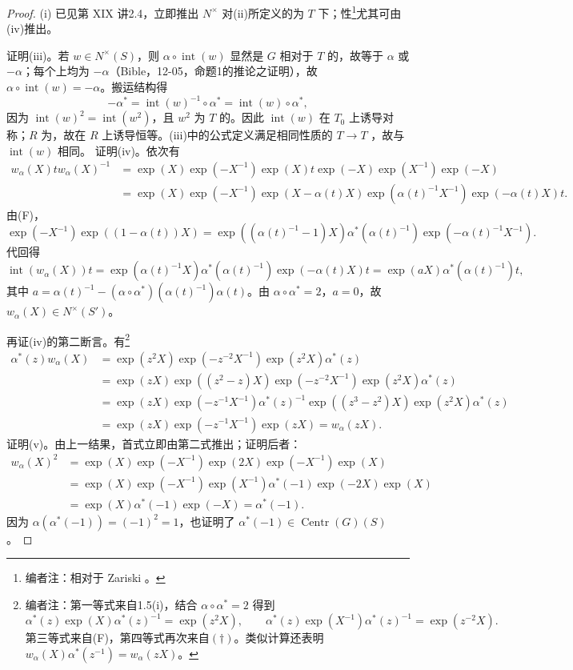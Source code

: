 \begin{proof}
(i) 已见第 XIX 讲2.4，立即推出 $N^\times$ 对(ii)所定义的为 $T$ 下；性\footnote{编者注：相对于 Zariski 。}尤其可由(iv)推出。

证明(iii)。若 $w\in N^\times(S)$，则 $\alpha\circ\operatorname{int}(w)$ 显然是 $G$ 相对于 $T$ 的，故等于 $\alpha$ 或 $-\alpha$；每个上均为 $-\alpha$（Bible，12-05，命题1的推论之证明），故 $\alpha\circ\operatorname{int}(w)=-\alpha$。搬运结构得
\[-\alpha^*=\operatorname{int}(w)^{-1}\circ\alpha^*=\operatorname{int}(w)\circ\alpha^*,\]
因为 $\operatorname{int}(w)^2=\operatorname{int}(w^2)$，且 $w^2$ 为 $T$ 的。因此 $\operatorname{int}(w)$ 在 $T_0$ 上诱导对称；$R$ 为，故在 $R$ 上诱导恒等。(iii)中的公式定义满足相同性质的 $T\to T$ ，故与 $\operatorname{int}(w)$ 相同。
证明(iv)。依次有
\[\begin{split}w_\alpha(X)tw_\alpha(X)^{-1}&=\exp(X)\exp(-X^{-1})\exp(X)t\exp(-X)\exp(X^{-1})\exp(-X)\\&=\exp(X)\exp(-X^{-1})\exp(X-\alpha(t)X)\exp(\alpha(t)^{-1}X^{-1})\exp(-\alpha(t)X)t.\end{split}\]
由(F)，
\[\exp(-X^{-1})\exp((1-\alpha(t))X)=\exp((\alpha(t)^{-1}-1)X)\alpha^*(\alpha(t)^{-1})\exp(-\alpha(t)^{-1}X^{-1}).\]
代回得
\[\operatorname{int}(w_\alpha(X))t=\exp(\alpha(t)^{-1}X)\alpha^*(\alpha(t)^{-1})\exp(-\alpha(t)X)t=\exp(aX)\alpha^*(\alpha(t)^{-1})t,\]
其中 $a=\alpha(t)^{-1}-(\alpha\circ\alpha^*)(\alpha(t)^{-1})\alpha(t)$。由 $\alpha\circ\alpha^*=2$，$a=0$，故 $w_\alpha(X)\in N^\times(S')$。

再证(iv)的第二断言。有\footnote{编者注：第一等式来自1.5(i)，结合 $\alpha\circ\alpha^*=2$ 得到
\[\alpha^*(z)\exp(X)\alpha^*(z)^{-1}=\exp(z^2X),\qquad\alpha^*(z)\exp(X^{-1})\alpha^*(z)^{-1}=\exp(z^{-2}X).\tag{$\dagger$}\]
第三等式来自(F)，第四等式再次来自$(\dagger)$。类似计算还表明 $w_\alpha(X)\alpha^*(z^{-1})=w_\alpha(zX)$。}
\[\begin{aligned}\alpha^*(z)w_\alpha(X)&=\exp(z^2X)\exp(-z^{-2}X^{-1})\exp(z^2X)\alpha^*(z)\\&=\exp(zX)\exp((z^2-z)X)\exp(-z^{-2}X^{-1})\exp(z^2X)\alpha^*(z)\\&=\exp(zX)\exp(-z^{-1}X^{-1})\alpha^*(z)^{-1}\exp((z^3-z^2)X)\exp(z^2X)\alpha^*(z)\\&=\exp(zX)\exp(-z^{-1}X^{-1})\exp(zX)=w_\alpha(zX).\end{aligned}\]
证明(v)。由上一结果，首式立即由第二式推出；证明后者：
\[\begin{aligned}w_\alpha(X)^2&=\exp(X)\exp(-X^{-1})\exp(2X)\exp(-X^{-1})\exp(X)\\&=\exp(X)\exp(-X^{-1})\exp(X^{-1})\alpha^*(-1)\exp(-2X)\exp(X)\\&=\exp(X)\alpha^*(-1)\exp(-X)=\alpha^*(-1).\end{aligned}\]
因为 $\alpha(\alpha^*(-1))=(-1)^2=1$，也证明了 $\alpha^*(-1)\in\operatorname{Centr}(G)(S)$。


\end{proof}

